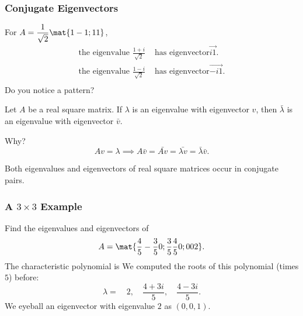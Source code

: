 
\begin{frame}
\frametitle{Conjugate Eigenvectors}

For $\displaystyle A = \frac 1{\sqrt 2}\mat{1 -1; 1 1}$,
\[\begin{split}
  \text{the eigenvalue $\frac{1+i}{\sqrt 2}$} & \text{ has eigenvector} \vec{i 1}.\\
  \text{the eigenvalue $\frac{1-i}{\sqrt 2}$} & \text{ has eigenvector} \vec{-i 1}.\\
\end{split}\]
\pause
Do you notice a pattern?
\pause

\begin{fact2}
  Let $A$ be a real square matrix.  If $\lambda$ is an eigenvalue with
  eigenvector $v$, then $\bar\lambda$ is an eigenvalue with eigenvector $\bar v$.
\end{fact2}

\pause\medskip
\alert{Why?}
\[ Av = \lambda \implies A\bar v = \bar{Av} = \bar{\lambda v}
= \bar\lambda\bar v. \]

\pause\smallskip
\begin{bluebox}{.6\linewidth}
  Both eigenvalues and eigenvectors of real square matrices occur in conjugate pairs.
\end{bluebox}

\end{frame}



\begin{frame}
\frametitle{A $3\times 3$ Example}

Find the eigenvalues and eigenvectors of
\[ A = \mat{\frac 45 -\frac 35 0; \frac 35 \frac 45 0; 0 0 2}. \]
\pause
The characteristic polynomial is
\pause
We computed the roots of this polynomial (times $5$) before:
\[ \lambda =\quad 2,\quad \frac{4+3i}5,\quad \frac{4-3i}5. \]
\pause
We eyeball an eigenvector with eigenvalue $2$ as $(0,0,1)$.

\end{frame}


